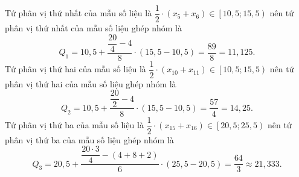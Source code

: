 \begin{bt}
{\begin{enumerate}[a)]
			Tứ phân vị thứ nhất của mẫu số liệu là $ \dfrac{1}{2}\cdot\left( x_{5}+x_6\right) \in \left[ 10{,}5 ; 15{,}5\right)$ nên tứ phân vị thứ nhất của mẫu số liệu ghép nhóm là $$Q_1=10{,}5 +\dfrac{\dfrac{20}{4}-4}{8}\cdot \left(15{,}5-10{,}5 \right)=\dfrac{89}{8}=11{,}125.$$
			Tứ phân vị thứ hai của mẫu số liệu là $ \dfrac{1}{2}\cdot\left( x_{10}+x_{11}\right) \in \left[ 10{,}5 ; 15{,}5\right)$ nên tứ phân vị thứ hai của mẫu số liệu ghép nhóm là $$Q_2=10{,}5 +\dfrac{\dfrac{20}{2}-4}{8}\cdot \left(15{,}5-10{,}5 \right)=\dfrac{57}{4}=14{,}25.$$
			Tứ phân vị thứ ba của mẫu số liệu là $ \dfrac{1}{2}\cdot\left( x_{15}+x_{16}\right) \in \left[ 20{,}5 ; 25{,}5\right)$ nên tứ phân vị thứ ba của mẫu số liệu ghép nhóm là $$Q_3=20{,}5 +\dfrac{\dfrac{20\cdot 3}{4}-(4+8+2)}{6}\cdot \left(25{,}5-20{,}5 \right)=\dfrac{64}{3}\approx 21{,}333.$$
		\end{enumerate}
	}
\end{bt}

